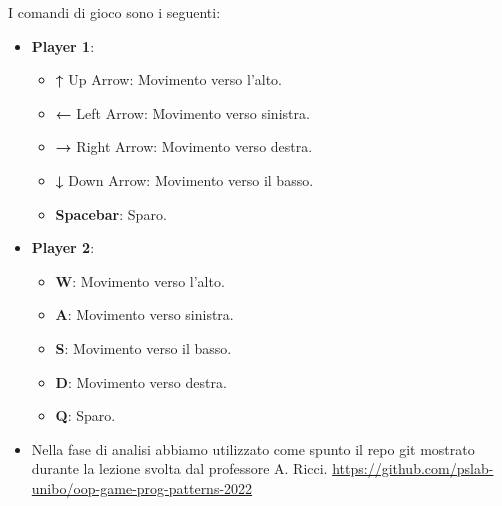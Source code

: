 \documentclass[a4paper,12pt]{report}
\begin{document}
I comandi di gioco sono i seguenti:
\begin{itemize}
	\item \textbf{Player 1}:
	\begin{itemize}
	    \item \textbf{↑} Up Arrow: Movimento verso l'alto.
        \item \textbf{←} Left Arrow: Movimento verso sinistra.
	    \item \textbf{→} Right Arrow: Movimento verso destra.
	    \item \textbf{↓} Down Arrow: Movimento verso il basso.
	    \item \textbf{Spacebar}: Sparo.
	\end{itemize}
	\item \textbf{Player 2}:
	\begin{itemize}
	    \item \textbf{W}: Movimento verso l'alto.
	    \item \textbf{A}: Movimento verso sinistra.
	    \item \textbf{S}: Movimento verso il basso.
	    \item \textbf{D}: Movimento verso destra.
	    \item \textbf{Q}: Sparo.
	\end{itemize}
\end{itemize}
%


\begin{itemize}
	\item Nella fase di analisi abbiamo utilizzato come spunto il repo git mostrato durante la lezione svolta dal professore A. Ricci. \url{https://github.com/pslab-unibo/oop-game-prog-patterns-2022}
\end{itemize}
\end{document}
